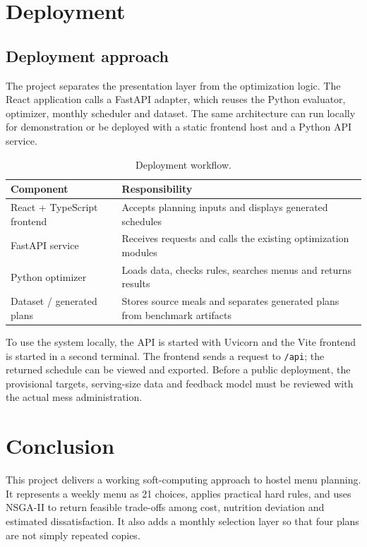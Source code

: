 \documentclass[12pt,a4paper]{report}
\begin{document}
\chapter{Deployment}
\section{Deployment approach}
The project separates the presentation layer from the optimization logic. The React application calls a FastAPI adapter, which reuses the Python evaluator, optimizer, monthly scheduler and dataset. The same architecture can run locally for demonstration or be deployed with a static frontend host and a Python API service.

\begin{table}[H]
\centering
\caption{Deployment workflow.}
\begin{tabularx}{\textwidth}{lY}
\toprule
\textbf{Component} & \textbf{Responsibility}\\ \midrule
React + TypeScript frontend & Accepts planning inputs and displays generated schedules\\
FastAPI service & Receives requests and calls the existing optimization modules\\
Python optimizer & Loads data, checks rules, searches menus and returns results\\
Dataset / generated plans & Stores source meals and separates generated plans from benchmark artifacts\\
\bottomrule
\end{tabularx}
\end{table}

To use the system locally, the API is started with Uvicorn and the Vite frontend is started in a second terminal. The frontend sends a request to \texttt{/api}; the returned schedule can be viewed and exported. Before a public deployment, the provisional targets, serving-size data and feedback model must be reviewed with the actual mess administration.

\chapter{Conclusion}
This project delivers a working soft-computing approach to hostel menu planning. It represents a weekly menu as 21 choices, applies practical hard rules, and uses NSGA-II to return feasible trade-offs among cost, nutrition deviation and estimated dissatisfaction. It also adds a monthly selection layer so that four plans are not simply repeated copies.
\end{document}
